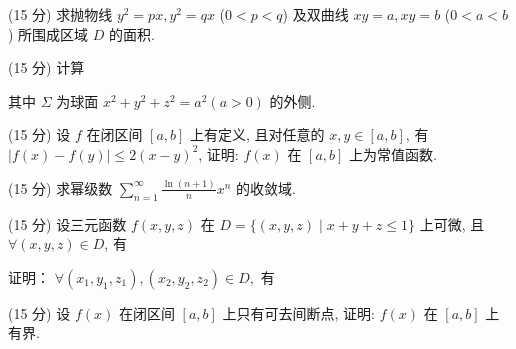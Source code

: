 (15 分) 求抛物线 $y^{2} = px, y^{2} = qx$ ($0 < p < q$) 及双曲线 $xy = a, xy = b$ ($0 < a < b$) 所围成区域 $D$ 的面积.\par
\par{}
(15 分) 计算\par
\nopagebreak[4]
其中 $\Sigma$ 为球面 $x^{2} + y^{2} + z^{2} = a^{2}(a > 0)$ 的外侧.\par
(15 分) 设 $f$ 在闭区间 $[a, b]$ 上有定义, 且对任意的 $x, y \in [a, b]$, 有 $|f(x) - f(y)| \leq 2(x - y)^2$, 证明: $f(x)$ 在 $[a, b]$ 上为常值函数.\par
(15 分) 求幂级数 $\sum_{n=1}^{\infty} \frac{\ln(n+1)}{n} x^n$ 的收敛域.\par
\par{}
(15 分) 设三元函数 $f(x, y, z)$ 在 $D = \{(x, y, z) \mid x + y + z \leq 1\}$ 上可微, 且 $\forall (x, y, z) \in D$, 有\par
\nopagebreak[4]
\par{}
证明： $\forall (x_{1},y_{1},z_{1}),(x_{2},y_{2},z_{2})\in D,$ 有\par
\nopagebreak[4]
(15 分) 设 $f(x)$ 在闭区间 $[a, b]$ 上只有可去间断点, 证明: $f(x)$ 在 $[a, b]$ 上有界.\par
